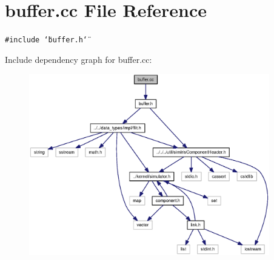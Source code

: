 \section{buffer.cc File Reference}
\label{buffer_8cc}
{\tt \#include \char`\"{}buffer.h\char`\"{}}\par


Include dependency graph for buffer.cc:\nopagebreak
\begin{figure}[H]
\begin{center}
\leavevmode
\includegraphics[width=297pt]{buffer_8cc__incl}
\end{center}
\end{figure}
